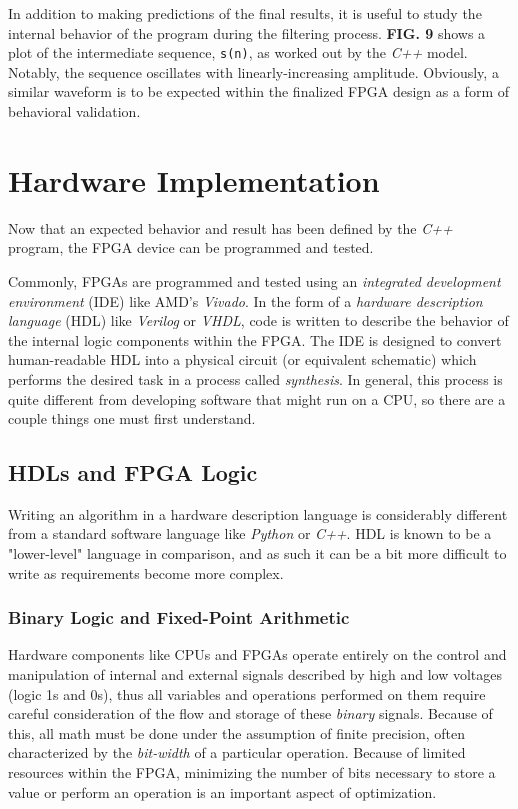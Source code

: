 \documentclass[reprint,amsmath,amssymb]{revtex4-2}
\begin{document}
In addition to making predictions of the final results, it is useful to study the internal behavior of the program during the filtering process. \textbf{FIG. 9} shows a plot of the intermediate sequence, \verb+s(n)+, as worked out by the \textit{C++} model. Notably, the sequence oscillates with linearly-increasing amplitude. Obviously, a similar waveform is to be expected within the finalized FPGA design as a form of behavioral validation.

\section{Hardware Implementation}

Now that an expected behavior and result has been defined by the \textit{C++} program, the FPGA device can be programmed and tested.

Commonly, FPGAs are programmed and tested using an \textit{integrated development environment} (IDE) like AMD's \textit{Vivado}. In the form of a \textit{hardware description language} (HDL) like \textit{Verilog} or \textit{VHDL}, code is written to describe the behavior of the internal logic components within the FPGA. The IDE is designed to convert human-readable HDL into a physical circuit (or equivalent schematic) which performs the desired task in a process called \textit{synthesis}. In general, this process is quite different from developing software that might run on a CPU, so there are a couple things one must first understand.

\subsection{HDLs and FPGA Logic}
Writing an algorithm in a hardware description language is considerably different from a standard software language like \textit{Python} or \textit{C++}. HDL is known to be a "lower-level" language in comparison, and as such it can be a bit more difficult to write as requirements become more complex.

\subsubsection{Binary Logic and Fixed-Point Arithmetic}
Hardware components like CPUs and FPGAs operate entirely on the control and manipulation of internal and external signals described by high and low voltages (logic 1s and 0s), thus all variables and operations performed on them require careful consideration of the flow and storage of these \textit{binary} signals. Because of this, all math must be done under the assumption of finite precision, often characterized by the \textit{bit-width} of a particular operation. Because of limited resources within the FPGA, minimizing the number of bits necessary to store a value or perform an operation is an important aspect of optimization.
\end{document}
